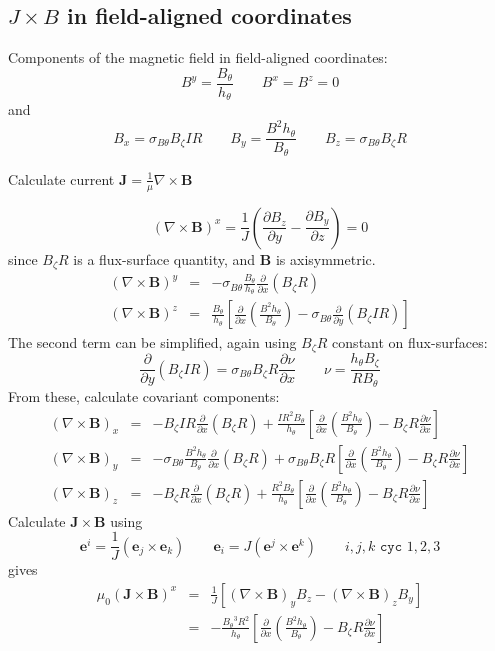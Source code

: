 \documentclass[12pt]{article}
\newcommand{\sbt}{\ensuremath{\sigma_{B\theta}}}
\newcommand{\deriv}[2]{\ensuremath{\frac{\partial #1}{\partial #2}}}
\newcommand{\hthe}{\ensuremath{h_\theta}}
\newcommand{\Bp}{\ensuremath{B_\theta}}
\newcommand{\Bt}{\ensuremath{B_\zeta}}
\newcommand{\Vec}[1]{\ensuremath{\mathbf{#1}}}
\newcommand{\Bvec}{\Vec{B}}
\newcommand{\Jvec}{\Vec{J}}
\newcommand{\Curl}[1]{\ensuremath{\nabla\times #1 }}
\begin{document}
\subsection{$J\times B$ in field-aligned coordinates}
\label{sec:jxb_fac}

Components of the magnetic field in field-aligned coordinates:
\[
B^y = \frac{\Bp}{\hthe} \qquad B^x = B^z = 0
\]
and
\[
B_x = \sbt\Bt I R \qquad B_y = \frac{B^2\hthe}{\Bp} \qquad B_z = \sbt\Bt R
\]

Calculate current $\Jvec = \frac{1}{\mu}\Curl{\Bvec}$

\[
\left(\Curl{\Bvec}\right)^x = \frac{1}{J}\left(\deriv{B_z}{y} - \deriv{B_y}{z}\right) = 0
\]
since $\Bt R$ is a flux-surface quantity, and $\Bvec$ is axisymmetric.
\begin{eqnarray*}
\left(\Curl{\Bvec}\right)^y &=& -\sbt\frac{\Bp}{\hthe}\deriv{}{x}\left(\Bt R\right) \\
\left(\Curl{\Bvec}\right)^z &=& \frac{\Bp}{\hthe}\left[\deriv{}{x}\left(\frac{B^2\hthe}{\Bp}\right) - \sbt\deriv{}{y}\left(\Bt I R\right)\right]
\end{eqnarray*}
The second term can be simplified, again using $\Bt R$ constant on flux-surfaces:
\[
\deriv{}{y}\left(\Bt I R\right) = \sbt\Bt R\deriv{\nu}{x} \qquad \nu = \frac{\hthe\Bt}{R\Bp}
\]
From these, calculate covariant components:
\begin{eqnarray}
\left(\Curl{\Bvec}\right)_x &=& -\Bt I R \deriv{}{x}\left(\Bt R\right) + \frac{IR^2\Bp}{\hthe}\left[\deriv{}{x}\left(\frac{B^2\hthe}{\Bp}\right) - \Bt R\deriv{\nu}{x}\right] \nonumber\\
\left(\Curl{\Bvec}\right)_y &=& -\sbt\frac{B^2\hthe}{\Bp}\deriv{}{x}\left(\Bt R\right) + \sbt\Bt R\left[\deriv{}{x}\left(\frac{B^2\hthe}{\Bp}\right) - \Bt R\deriv{\nu}{x}\right] \label{eq:curlb_y}\\
\left(\Curl{\Bvec}\right)_z &=& -\Bt R\deriv{}{x}\left(\Bt R\right) + \frac{R^2\Bp}{\hthe}\left[\deriv{}{x}\left(\frac{B^2\hthe}{\Bp}\right) - \Bt R\deriv{\nu}{x}\right] \nonumber
\end{eqnarray}
Calculate $\Jvec\times\Bvec$ using
\begin{equation}
\mathbf{e}^i = \frac{1}{J}\left(\mathbf{e}_j \times \mathbf{e}_k\right) \qquad \mathbf{e}_i = J\left(\mathbf{e}^j \times \mathbf{e}^k\right) \qquad i,j,k \texttt{ cyc } 1,2,3
\label{eq:j_cross_b}
\end{equation}
gives 
\begin{eqnarray*}
\mu_0 \left(\Jvec\times\Bvec\right)^x &=& \frac{1}{J}\left[\left(\Curl{\Bvec}\right)_y B_z - \left(\Curl{\Bvec}\right)_z B_y \right]\\
&=& -\frac{\Bp^3 R^2}{\hthe}\left[\deriv{}{x}\left(\frac{B^2\hthe}{\Bp}\right) - \Bt R\deriv{\nu}{x}\right]
\end{eqnarray*}
\end{document}
